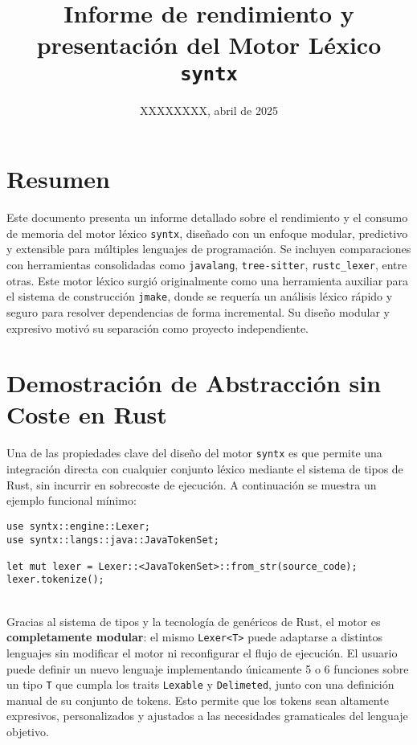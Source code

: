 \documentclass{article}
\title{Informe de rendimiento y presentación del Motor Léxico \texttt{syntx}}
\author{XXXXXXXX, abril de 2025}
\date{}
\begin{document}
\maketitle

\section*{Resumen}

Este documento presenta un informe detallado sobre el rendimiento y el consumo de memoria del motor léxico \texttt{syntx}, diseñado con un enfoque modular, predictivo y extensible para múltiples lenguajes de programación. Se incluyen comparaciones con herramientas consolidadas como \texttt{javalang}, \texttt{tree-sitter}, \texttt{rustc\_lexer}, entre otras.
Este motor léxico surgió originalmente como una herramienta auxiliar para el sistema de construcción \texttt{jmake}, donde se requería un análisis léxico rápido y seguro para resolver dependencias de forma incremental. Su diseño modular y expresivo motivó su separación como proyecto independiente.
\section*{Demostración de Abstracción sin Coste en Rust}

Una de las propiedades clave del diseño del motor \texttt{syntx} es que permite una integración directa con cualquier conjunto léxico mediante el sistema de tipos de Rust, sin incurrir en sobrecoste de ejecución. A continuación se muestra un ejemplo funcional mínimo:

\begin{verbatim}
use syntx::engine::Lexer;
use syntx::langs::java::JavaTokenSet;

let mut lexer = Lexer::<JavaTokenSet>::from_str(source_code);
lexer.tokenize();
\end{verbatim}
\\
Gracias al sistema de tipos y la tecnología de genéricos de Rust, el motor es \textbf{completamente modular}: el mismo \texttt{Lexer<T>} puede adaptarse a distintos lenguajes sin modificar el motor ni reconfigurar el flujo de ejecución. El usuario puede definir un nuevo lenguaje implementando únicamente 5 o 6 funciones sobre un tipo \texttt{T} que cumpla los traits \texttt{Lexable} y \texttt{Delimeted}, junto con una definición manual de su conjunto de tokens. Esto permite que los tokens sean altamente expresivos, personalizados y ajustados a las necesidades gramaticales del lenguaje objetivo.
\end{document}
